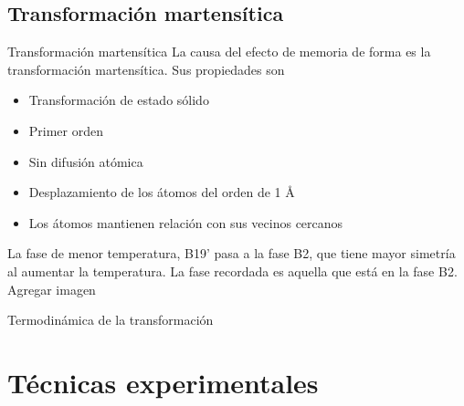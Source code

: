 \documentclass[11pt]{beamer}
\begin{document}
\subsection{Transformación martensítica}
\begin{frame}{Transformación martensítica}
La causa del efecto de memoria de forma es la transformación martensítica.
Sus propiedades son
\begin{itemize}
	\item Transformación de estado sólido
	\item Primer orden
	\item Sin difusión atómica
	\item Desplazamiento de los átomos del orden de 1 \AA
	\item Los átomos mantienen relación con sus vecinos cercanos
\end{itemize}
\end{frame}
\begin{frame}
La fase de menor temperatura, B19' pasa a la fase B2, que tiene mayor simetría al aumentar la temperatura. La fase recordada es aquella que está en la fase B2. Agregar imagen
\end{frame}
\begin{frame}{Termodinámica de la transformación}

\end{frame}
\section{Técnicas experimentales}
\end{document}

